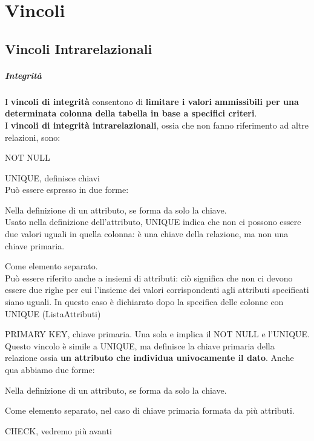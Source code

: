 \documentclass[10pt]{book}
\begin{document}
\chapter{Vincoli}
\section{Vincoli Intrarelazionali}
\paragraph{Integrità} I \textbf{vincoli di integrità} consentono di \textbf{limitare i valori ammissibili per una determinata colonna della tabella in base a specifici criteri}.\\
I \textbf{vincoli di integrità intrarelazionali}, ossia che non fanno riferimento ad altre relazioni, sono:
\begin{list}{}{}
	\item NOT NULL
	\item UNIQUE, definisce chiavi\\
	Può essere espresso in due forme:
	\begin{list}{}{}
		\item Nella definizione di un attributo, se forma da solo la chiave.\\
		Usato nella definizione dell'attributo, UNIQUE indica che non ci possono essere due valori uguali in quella colonna: è una chiave della relazione, ma non una chiave primaria.
		\item Come elemento separato.\\
		Può essere riferito anche a insiemi di attributi: ciò significa che non ci devono essere due righe per cui l'insieme dei valori corrispondenti agli attributi specificati siano uguali. In questo caso è dichiarato dopo la specifica delle colonne con UNIQUE (ListaAttributi)
	\end{list}
	\item PRIMARY KEY, chiave primaria. Una sola e implica il NOT NULL e l'UNIQUE.\\
	Questo vincolo è simile a UNIQUE, ma definisce la chiave primaria della relazione ossia \textbf{un attributo che individua univocamente il dato}. Anche qua abbiamo due forme:
	\begin{list}{}{}
		\item Nella definizione di un attributo, se forma da solo la chiave.		
		\item Come elemento separato, nel caso di chiave primaria formata da più attributi.
	\end{list}
	\item CHECK, vedremo più avanti
\end{list}
\end{document}
